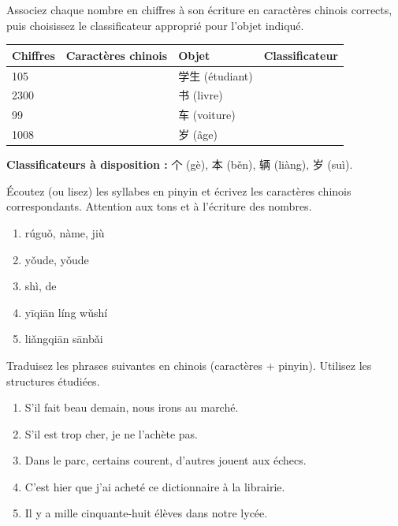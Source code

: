 \documentclass[11pt]{article}
\newcounter{popsec}
\newcounter{popsub}
\newcommand{\courssub}[1]{%
  \stepcounter{popsub}%
  \par\vspace{9pt}\noindent{\popxbold\fontsize{11.5}{13}\selectfont\color{popink}{\color{poporange}\thepopsec.\thepopsub}\hspace{6pt}#1}\par\nopagebreak\vspace{4pt}
}
\begin{document}
\begin{exercice}
Associez chaque nombre en chiffres à son écriture en caractères chinois corrects, puis choisissez le classificateur approprié pour l'objet indiqué.
\begin{center}
\begin{tabularx}{\linewidth}{|X|X|X|X|}
\hline
\rowcolor{popblueL} Chiffres & Caractères chinois & Objet & Classificateur \\
\hline
105 & & 学生 (étudiant) & \\
\hline
2300 & & 书 (livre) & \\
\hline
99 & & 车 (voiture) & \\
\hline
1008 & & 岁 (âge) & \\
\hline
\end{tabularx}
\end{center}
\textbf{Classificateurs à disposition :} 个 (gè), 本 (běn), 辆 (liàng), 岁 (suì).
\end{exercice}

\begin{exercice}
Écoutez (ou lisez) les syllabes en pinyin et écrivez les caractères chinois correspondants. Attention aux tons et à l'écriture des nombres.
\begin{enumerate}
    \item rúguǒ, nàme, jiù
    \item yǒude, yǒude
    \item shì, de
    \item yīqiān líng wǔshí
    \item liǎngqiān sānbǎi
\end{enumerate}
\end{exercice}

\courssub{Je m'entraîne}

\begin{exercice}
Traduisez les phrases suivantes en chinois (caractères + pinyin). Utilisez les structures étudiées.
\begin{enumerate}
    \item S'il fait beau demain, nous irons au marché.
    \item S'il est trop cher, je ne l'achète pas.
    \item Dans le parc, certains courent, d'autres jouent aux échecs.
    \item C'est hier que j'ai acheté ce dictionnaire à la librairie.
    \item Il y a mille cinquante-huit élèves dans notre lycée.
\end{enumerate}
\end{exercice}
\end{document}
